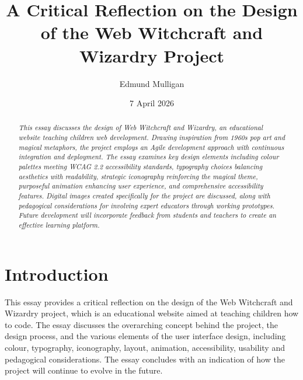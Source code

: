 \documentclass[a4paper, 12pt]{article}
\title{A Critical Reflection on the Design of the Web Witchcraft and Wizardry Project}
\author{Edmund Mulligan}
\date{7 April 2026}
\begin{document}


\maketitle

\begin{abstract}
\itshape
This essay discusses the design of Web Witchcraft and Wizardry, an educational website teaching children web development. Drawing inspiration from 1960s pop art and magical metaphors, the project employs an Agile development approach with continuous integration and deployment. The essay examines key design elements including colour palettes meeting WCAG 2.2 accessibility standards, typography choices balancing aesthetics with readability, strategic iconography reinforcing the magical theme, purposeful animation enhancing user experience, and comprehensive accessibility features. Digital images created specifically for the project are discussed, along with pedagogical considerations for involving expert educators through working prototypes. Future development will incorporate feedback from students and teachers to create an effective learning platform.
\end{abstract}

\tableofcontents
\newpage

\listoffigures
\newpage

\section{Introduction}
This essay provides a critical reflection on the design of the Web Witchcraft and Wizardry project, which is an educational website aimed at teaching children how to code. The essay discusses the overarching concept behind the project, the design process, and the various elements of the user interface design, including colour, typography, iconography, layout, animation, accessibility, usability and pedagogical considerations. The essay concludes with an indication of how the project will continue to evolve in the future.
\end{document}
